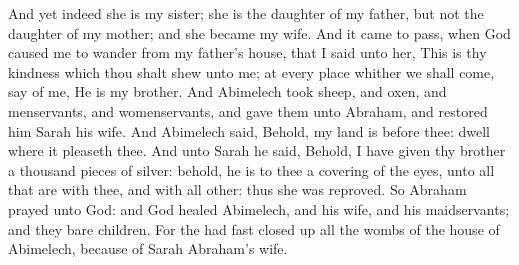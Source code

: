 \begin{biblechapter}
\verse And yet indeed she is my sister; she is the daughter of my father, but not the daughter of my mother; and she became my wife.
\verse And it came to pass, when God caused me to wander from my father's house, that I said unto her, This is thy kindness which thou shalt shew unto me; at every place whither we shall come, say of me, He is my brother.
\verse And Abimelech took sheep, and oxen, and menservants, and womenservants, and gave them unto Abraham, and restored him Sarah his wife.
\verse And Abimelech said, Behold, my land is before thee: dwell where it pleaseth thee.
\verse And unto Sarah he said, Behold, I have given thy brother a thousand pieces of silver: behold, he is to thee a covering of the eyes, unto all that are with thee, and with all other: thus she was reproved.
\verse So Abraham prayed unto God: and God healed Abimelech, and his wife, and his maidservants; and they bare children.
\verse For the \LORD had fast closed up all the wombs of the house of Abimelech, because of Sarah Abraham's wife.
\end{biblechapter}

